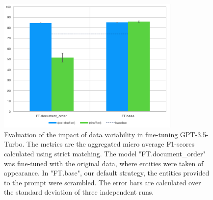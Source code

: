\begin{figure}[htbp]
  \centering
  \includegraphics[width=0.8\textwidth]{figures/re-eval-ft} 
  \caption{Evaluation of the impact of data variability in fine-tuning GPT-3.5-Turbo. The metrics are the aggregated micro average F1-scores calculated using strict matching. The model "FT.document\_order" was fine-tuned with the original data, where entities were taken of appearance. In "FT.base", our default strategy, the entities provided to the prompt were scrambled. The error bars are calculated over the standard deviation of three independent runs.}
  \label{fig:re-eval-ft}
\end{figure}

\clearpage

\appendix
\label{appendix}


